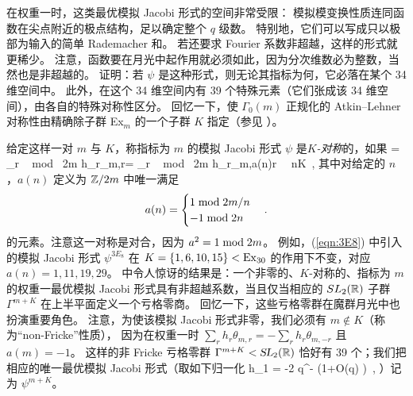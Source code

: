 
在权重一时，这类最优模拟 Jacobi 形式的空间非常受限：
模拟模变换性质连同函数在尖点附近的极点结构，足以确定整个 $q$ 级数。
特别地，它们可以写成只以极部为输入的简单 Rademacher 和。
若还要求 Fourier 系数非超越，这样的形式就更稀少。
注意，函数要在月光中起作用就必须如此，因为分次维数必为整数，当然也是非超越的。
\cite{omjt} 证明：若 $\psi$ 是这种形式，则无论其指标为何，它必落在某个 34 维空间中。
此外，在这个 34 维空间内有 39 个特殊元素（它们张成该 34 维空间），由各自的特殊对称性区分。
回忆一下，使 $\Gamma_0(m)$ 正规化的 Atkin--Lehner 对称性由精确除子群 Ex$_m$ 的一个子群 $K$ 指定（参见 ）。


给定这样一对 $m$ 与 $K$，称指标为 $m$ 的模拟 Jacobi 形式 $\psi$ 是\emph{$K$-对称}的，如果
\be\label{def:ALsymJac}
\psi = \sum_{r ~ \rm{mod} ~2m} h_r\theta_{m,r}= \sum_{r ~ \rm{mod} ~2m} h_{r}\theta_{m,a(n)r}~~{} n\in K~,
\ee
其中对给定的 $n$，$a(n)$ 定义为 $\mathbb{Z}/2m$ 中唯一满足
\[
a(n) = \begin{cases} 1{\rm \;mod\;}{2m/n} \\  -1{\rm \;mod\;}{2n}\end{cases}. 
\]
的元素。注意这一对称是对合，因为 $a^2=1{\rm \;mod\;}{2m}$。
例如，(\ref{eqn:3E8}) 中引入的模拟 Jacobi 形式 $\psi^{3E_8}$ 在 $K=\{1,6,10,15\}<{\rm{Ex}}_{30}$ 的作用下不变，对应 $a(n)=1,11,19,29$。
\cite{omjt} 中令人惊讶的结果是：一个非零的、$K$-对称的、指标为 $m$ 的权重一最优模拟 Jacobi 形式具有非超越系数，当且仅当相应的 $SL_2(\mathbb{R})$ 子群 $\Gamma^{m+K}$ 在上半平面定义一个亏格零商。
回忆一下，这些亏格零群在魔群月光中也扮演重要角色。
注意，为使该模拟 Jacobi 形式非零，我们必须有 $m\not\in K$（称为“non-Fricke”性质），
因为在权重一时 $\sum_{r } h_r\theta_{m,r}=-\sum_{r } h_r\theta_{m,-r}$ 且 $a(m)=-1$。
这样的非 Fricke 亏格零群 $\Gamma^{m+K}<\operatorname{\textsl{SL}}_2(\mathbb{R})$ 恰好有 39 个；我们把相应的唯一最优模拟 Jacobi 形式（取如下归一化
\be\label{def:normalisation_um}
h_1 = -2 q^{-} (1+O(q) )~,\ee
）记为 $\psi^{m+K}$。

